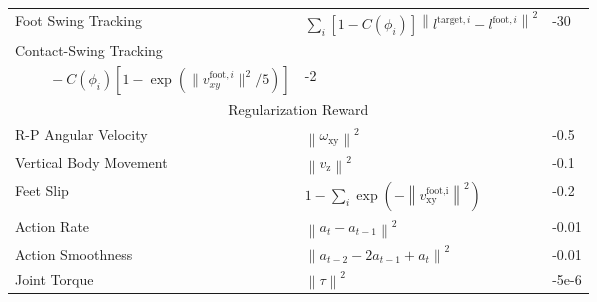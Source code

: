 \begin{table}[t]
{\begin{tabular}{l|l|l}
Foot Swing Tracking & $\sum_i [1-C(\phi_i)]\left \| l^{\text{target},i} - l^{\text{foot},i} \right \|^2$                                                                                                                       & -30                        \\
Contact-Swing Tracking   & \makecell[l]{$
-\sum_i [1-C(\phi_i)]\left[1-\exp(\left \|  f^{\text{foot}, i} \right \|^2 / 50)\right]$ \\
$~~~~~~~~~~~ -C(\phi_i)\left[1-\exp\left(\| v^{\text{foot}, i}_{xy} \|^2 / 5\right)\right]$} & -2                         \\ \midrule
\multicolumn{3}{c}{Regularization Reward}                                                                                                                                                                                                                 \\ \midrule
R-P Angular Velocity      & $\left \| \omega_{\text{xy}} \right \|^2$                                                                                                                                                       & -0.5                       \\
Vertical Body Movement            & $\left \| v_{\text{z}} \right \|^2$                                                                                                                                                           & -0.1                       \\
Feet Slip                & $1- \sum_i \exp\left(-\left \| v_{\text{xy}}^\text{foot,i} \right \|^2\right)$                                                                                                                                           & -0.2                       \\
Action Rate              & $\left \| a_t - a_{t-1} \right \|^2$                                                                                                                                                       & -0.01                      \\
Action Smoothness        & $\left \| a_{t-2}-2a_{t-1}+a_t \right \|^2$                                                                                                                                                & -0.01                      \\
Joint Torque             & $\left \| \tau \right \|^2$                                                                                                                                                            & -5e-6                      \\

\end{tabular}}
\end{table}
